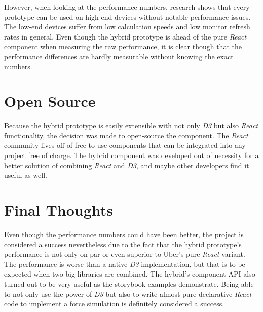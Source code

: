 However, when looking at the performance numbers, research shows that every prototype can be used on high-end devices without notable performance issues. The low-end devices suffer from low calculation speeds and low monitor refresh rates in general. Even though the hybrid prototype is ahead of the pure \emph{React} component when measuring the raw performance, it is clear though that the performance differences are hardly measurable without knowing the exact numbers.

\section{Open Source}

Because the hybrid prototype is easily extensible with not only \emph{D3} but also \emph{React} functionality, the decision was made to open-source the component. The \emph{React} community lives off of free to use components that can be integrated into any project free of charge. The hybrid component was developed out of necessity for a better solution of combining \emph{React} and \emph{D3}, and maybe other developers find it useful as well.

\section{Final Thoughts}

Even though the performance numbers could have been better, the project is considered a success nevertheless due to the fact that the hybrid prototype's performance is not only on par or even superior to Uber's pure \emph{React} variant. The performance is worse than a native \emph{D3} implementation, but that is to be expected when two big libraries are combined. The hybrid's component API also turned out to be very useful as the storybook examples demonstrate. Being able to not only use the power of \emph{D3} but also to write almost pure declarative \emph{React} code to implement a force simulation is definitely considered a success.







